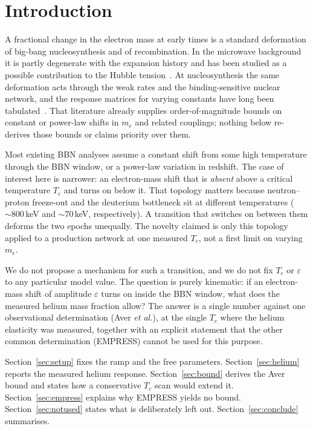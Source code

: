 \documentclass[aps,prd,twocolumn,superscriptaddress,nofootinbib,10pt]{revtex4-2}
\begin{document}
\section{Introduction}\label{sec:intro}

A fractional change in the electron mass at early times is a standard deformation of big-bang
nucleosynthesis and of recombination. In the microwave background it is partly degenerate with
the expansion history and has been studied as a possible contribution to the Hubble
tension~\cite{HartChluba2018,HartChluba2020,SekiguchiTakahashi2021}. At nucleosynthesis the same
deformation acts through the weak rates and the binding-sensitive nuclear network, and the
response matrices for varying constants have long been tabulated~\cite{DentSternWetterich2007}.
That literature already supplies order-of-magnitude bounds on constant or power-law shifts in
$m_e$ and related couplings; nothing below re-derives those bounds or claims priority over them.

Most existing BBN analyses assume a constant shift from some high temperature through the BBN
window, or a power-law variation in redshift. The case of interest here is narrower: an
electron-mass shift that is \emph{absent} above a critical temperature $T_c$ and turns on below
it. That topology matters because neutron--proton freeze-out and the deuterium bottleneck sit at
different temperatures ($\sim\!800\,$keV and $\sim\!70\,$keV, respectively). A transition that
switches on between them deforms the two epochs unequally. The novelty claimed is only this
topology applied to a production network at one measured $T_c$, not a first limit on varying
$m_e$.

We do not propose a mechanism for such a transition, and we do not fix $T_c$ or $\varepsilon$ to
any particular model value. The question is purely kinematic: if an electron-mass shift of
amplitude $\varepsilon$ turns on inside the BBN window, what does the measured helium mass fraction
allow? The answer is a single number against one observational determination (Aver \emph{et al.}),
at the single $T_c$ where the helium elasticity was measured, together with an explicit statement
that the other common determination (EMPRESS) cannot be used for this purpose.

Section~\ref{sec:setup} fixes the ramp and the free parameters. Section~\ref{sec:helium} reports
the measured helium response. Section~\ref{sec:bound} derives the Aver bound and states how a
conservative $T_c$ scan would extend it. Section~\ref{sec:empress} explains why EMPRESS yields no
bound. Section~\ref{sec:notused} states what is deliberately left out. Section~\ref{sec:conclude}
summarises.
\end{document}
